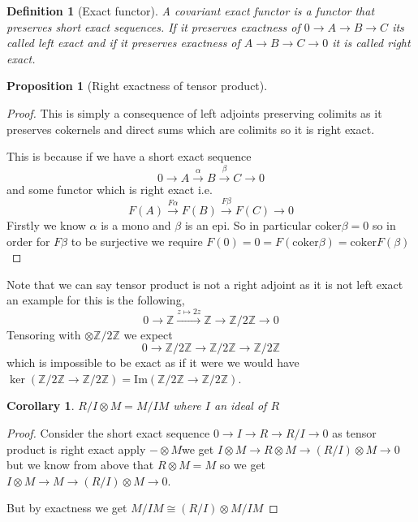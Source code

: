 \documentclass[12pt]{article}
\numberwithin{equation}{section}
\newcommand{\Z}{\mathbb{Z}}
\newcommand{\image}{{\mathrm{Im}}}
\newtheorem{definition}{Definition}[section]
\newtheorem{corollary}{Corollary}[theorem]
\newtheorem{proposition}{Proposition}[section]
\begin{document}
	\begin{definition}[Exact functor]
		A covariant exact functor is a functor that preserves short exact sequences. If it preserves exactness of $0 \to A \to B \to C$ its called left exact and if it preserves exactness of $A \to B \to C \to 0$ it is called right exact. 
	\end{definition}
	
	\begin{proposition}[Right exactness of tensor product]
		
	\end{proposition}
	\begin{proof}
		This is simply a consequence of left adjoints preserving colimits as it preserves cokernels and direct sums which are colimits so it is right exact.
		
		This is because if we have a short exact sequence \[ 0 \to A \xrightarrow{\alpha} B \xrightarrow{\beta} C \to 0\] and some functor which is right exact i.e.
		\[ F(A) \xrightarrow{F\alpha } F(B) \xrightarrow{F \beta } F(C) \to 0\]
		Firstly we know $\alpha $ is a mono and $\beta $ is an epi. So in particular $\mathrm{coker} \beta=0$ so in order for $ F \beta$ to be surjective we require $F(0)=0=F(\mathrm{coker} \beta )= \mathrm{coker}F(\beta)$
	 \end{proof}
	 Note that we can say tensor product is not a right adjoint as it is not left exact an example for this is the following,
	 \[ 0 \to \Z \xrightarrow{z \mapsto 2z} \Z \to \Z/2\Z \to 0 \]
	 Tensoring with $\otimes \Z/2\Z$ we expect \[ 0 \to \Z/2\Z \to \Z/2\Z \to \Z/2\Z  \] which is impossible to be exact as if it were we would have $\ker (\Z/2\Z \to \Z/2\Z ) = \image (\Z/2\Z \to \Z/2\Z )$.
	
	
	\begin{corollary}
		$R/I \otimes M = M/IM$ where $I$ an ideal of $R$
	\end{corollary}
	\begin{proof}
		Consider the short exact sequence $0 \to I \to R \to R/I \to 0$ as tensor product is right exact apply $-\otimes M$we get $I \otimes M \to R \otimes M \to (R/I) \otimes M \to 0$ but we know from above that $R \otimes M = M$ so we get $ I \otimes M \to M \to (R/I) \otimes M \to 0$.
		
		But by exactness we get $M/IM \cong (R/I) \otimes M/IM$
	\end{proof}
	
%	
	
\end{document}
